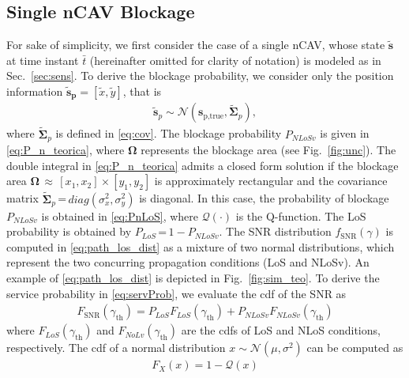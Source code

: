 \documentclass[journal]{IEEEtran}
\begin{document}
\subsection{Single nCAV Blockage}
For sake of simplicity, we first consider the case of a single nCAV, whose state $\mathbf{\tilde{s}}$ at time instant $\bar{t}$ (hereinafter omitted for clarity of notation) is modeled as in Sec.~\ref{sec:sens}. To derive the blockage probability, we consider only the position information $\mathbf{\tilde{s}_p} = [\tilde{x}, \tilde{y}]$, that is
%
\begin{align}\label{eq:statPos}
    \mathbf{\tilde{s}}_p \sim \mathcal{N}\left(\mathbf{s}_{\text{{p},true}}, \boldsymbol{\tilde{\Sigma}}_p\right),
\end{align}
where $\boldsymbol{\tilde{\Sigma}}_p$ is defined in \eqref{eq:cov}. The blockage probability $P_{{NLoSv}}$ is given in \eqref{eq:P_n_teorica}, where $\boldsymbol{\Omega}$ represents the blockage area (see Fig.~\ref{fig:unc}). 
The double integral in \eqref{eq:P_n_teorica} admits a closed form solution if the blockage area $\boldsymbol{\Omega}$\,$\approx$\,$[x_1, x_2]\times[y_1, y_2]$ is approximately rectangular and the covariance matrix $\boldsymbol{\tilde{\Sigma}}_p$\,=\,$diag\left(\sigma_x^2, \sigma_y^2\right)$ is diagonal. In this case, the probability of blockage $P_{{NLoSv}}$ is obtained in \eqref{eq:PnLoS}, where $\mathcal{Q}(\cdot)$ is the Q-function. 
The LoS probability is obtained by $P_{{LoS}}$\,=\,$1-P_{{NLoSv}}$.
The SNR distribution $f_{\mathrm{{SNR}}}(\gamma)$ is computed in \eqref{eq:path_los_dist} as a mixture of two normal distributions, which represent the two concurring propagation conditions (LoS and NLoSv). An example of \eqref{eq:path_los_dist} is depicted in Fig.~\ref{fig:sim_teo}.
To derive the service probability in \eqref{eq:servProb}, we evaluate the cdf of the SNR as
%
\begin{align} \label{eq:sum_of_cdf}
    F_{\text{SNR}}(\gamma_{\text{th}})= P_{{LoS}}   F_{{LoS}}(\gamma_{\text{th}}) +  P_{{NLoSv}}  F_{{NLoSv}}(\gamma_{\text{th}})
\end{align}
where $F_{{LoS}}(\gamma_{\text{th}})$ and $F_{{NoLv}}(\gamma_{\text{th}})$ are the cdfs of LoS and NLoS conditions, respectively. The cdf of a normal distribution $ x \sim \mathcal{N}(\mu, \sigma^2)$ can be computed as
\begin{align} \label{eq:cfd_sol}
    F_X(x)= 1-\mathcal{Q}(x)
\end{align}
\end{document}
